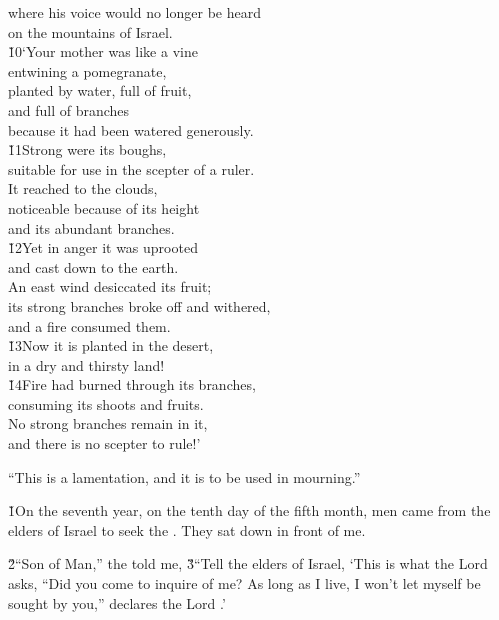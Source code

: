 \begin{poetry}
\poemll    where his voice would no longer be heard \\
\poemlll       on the mountains of Israel. \\
\poeml \v{10}`Your mother was like a vine \\
\poemll    entwining a pomegranate, \\
\poeml planted by water, full of fruit, \\
\poemll    and full of branches \\
\poemlll       because it had been watered generously. \\
\poeml \v{11}Strong were its boughs, \\
\poemll    suitable for use in the scepter of a ruler. \\
\poeml It reached to the clouds, \\
\poemll    noticeable because of its height \\
\poemlll       and its abundant branches. \\
\poeml \v{12}Yet in anger it was uprooted \\
\poemll    and cast down to the earth. \\
\poeml An east wind desiccated its fruit; \\
\poemll    its strong branches broke off and withered, \\
\poemlll       and a fire consumed them. \\
\poeml \v{13}Now it is planted in the desert, \\
\poemll    in a dry and thirsty land! \\
\poeml \v{14}Fire had burned through its branches, \\
\poemll    consuming its shoots and fruits. \\
\poeml No strong branches remain in it, \\
\poemll    and there is no scepter to rule!'
\end{poetry}

``This is a lamentation, and it is to be used in mourning.''

\v{1}On the seventh year, on the tenth day of the fifth month, men came from the elders of Israel to seek the . They sat down in front of me.

\v{2}``Son of Man,'' the  told me, \v{3}``Tell the elders of Israel, `This is what the Lord  asks, ``Did you come to inquire of me? As long as I live, I won't let myself be sought by you,'' declares the Lord .'

